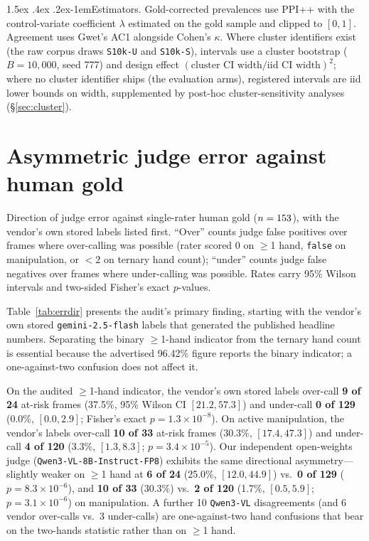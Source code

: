 \documentclass[11pt]{article}
\makeatletter
\renewcommand\paragraph{\@startsection{paragraph}{4}{\z@}%
  {1.5ex \@plus .4ex \@minus .2ex}{-1em}{\normalfont\normalsize\bfseries}}
\makeatother
\begin{document}
\paragraph{Estimators.}
Gold-corrected prevalences use PPI++ \citep{angelopoulos2023ppiplusplus} with the control-variate
coefficient $\lambda$ estimated on the gold sample and clipped to $[0,1]$. Agreement uses Gwet's
AC1 \citep{gwet2008ac1} alongside Cohen's $\kappa$. Where cluster identifiers exist (the raw
corpus draws \texttt{S10k-U} and \texttt{S10k-S}), intervals use a cluster bootstrap
($B = 10{,}000$, seed 777) and design effect $(\text{cluster CI width} / \text{iid CI width})^2$;
where no cluster identifier ships (the evaluation arms), registered intervals are iid lower bounds
on width, supplemented by post-hoc cluster-sensitivity analyses (\S\ref{sec:cluster}).

\section{Asymmetric judge error against human gold}
\label{sec:errdir}

\begin{table}[t]
\centering\footnotesize

\caption{Direction of judge error against single-rater human gold ($n = \vernierNPrimary{}$), with
the vendor's own stored labels listed first. ``Over'' counts judge false positives over frames
where over-calling was possible (rater scored 0 on $\geq$1 hand, \texttt{false} on manipulation,
or $<2$ on ternary hand count); ``under'' counts judge false negatives over frames where
under-calling was possible. Rates carry 95\% Wilson intervals and two-sided Fisher's exact
$p$-values.}
\label{tab:errdir}
\end{table}

Table~\ref{tab:errdir} presents the audit's primary finding, starting with the vendor's own stored
\texttt{gemini-2.5-flash} labels that generated the published headline numbers. Separating the
binary $\geq$1-hand indicator from the ternary hand count is essential because the advertised
96.42\% figure reports the binary indicator; a one-against-two confusion does not affect it.

On the audited $\geq$1-hand indicator, the vendor's own stored labels over-call \textbf{9 of 24}
at-risk frames (37.5\%, 95\% Wilson CI $[21.2, 57.3]$) and under-call \textbf{0 of 129} (0.0\%,
$[0.0, 2.9]$; Fisher's exact $p = 1.3\times 10^{-8}$). On active manipulation, the vendor's labels
over-call \textbf{10 of 33} at-risk frames (30.3\%, $[17.4, 47.3]$) and under-call \textbf{4 of
120} (3.3\%, $[1.3, 8.3]$; $p = 3.4\times 10^{-5}$). Our independent open-weights judge
(\texttt{Qwen3-VL-8B-Instruct-FP8}) exhibits the same directional asymmetry---slightly weaker on
$\geq$1 hand at \textbf{6 of 24} (25.0\%, $[12.0, 44.9]$) vs.\ \textbf{0 of 129} ($p =
8.3\times 10^{-6}$), and \textbf{10 of 33} (30.3\%) vs.\ \textbf{2 of 120} (1.7\%, $[0.5, 5.9]$;
$p = 3.1\times 10^{-6}$) on manipulation. A further 10 \texttt{Qwen3-VL} disagreements (and 6
vendor over-calls vs.\ 3 under-calls) are one-against-two hand confusions that bear on the
two-hands statistic rather than on $\geq$1 hand.
\end{document}
